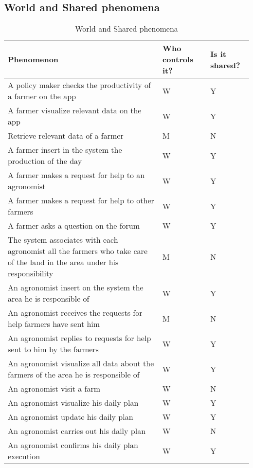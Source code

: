 \subsection{World and Shared phenomena}
\renewcommand{\arraystretch}{2}
\begin{longtable}{ |m{3.65cm}|m{3.25cm}|m{2.3cm}|}
\caption{World and Shared phenomena\label{long}}\\
\hline
\endfirsthead
\endhead
\hline
\endlastfoot
\rowcolor{white!40!blue!70}
\textbf{Phenomenon} & \textbf{Who controls it?} & \textbf{Is it shared?}\\
\hline
A policy maker checks the productivity of a farmer on the app & \centering W & \hfil Y\\
A farmer visualize relevant data on the app & \centering W & Y\\
Retrieve relevant data of a farmer & \centering M & N\\
A farmer insert in the system the production of the day & \centering W & Y\\
\hline
A farmer makes a request for help to an agronomist & \centering W & Y\\
A farmer makes a request for help to other farmers & \centering W & Y\\
A farmer asks a question on the forum & \centering W & Y\\
The system associates with each agronomist all the farmers who take care of the land in the area under his responsibility & \centering M & N\\
An agronomist insert on the system the area he is responsible of & \centering W & Y\\
An agronomist receives the requests for help farmers have sent him & \centering M & N\\
An agronomist replies to requests for help sent to him by the farmers & \centering W & Y\\
An agronomist visualize all data about the farmers of the area he is responsible of & \centering W & Y\\
An agronomist visit a farm & \centering W & N\\
\hline
An agronomist visualize his daily plan & \centering W & Y\\
An agronomist update his daily plan & \centering W & Y\\
An agronomist carries out his daily plan & \centering W & N\\
An agronomist confirms his daily plan execution & \centering W & Y\\

\end{longtable}